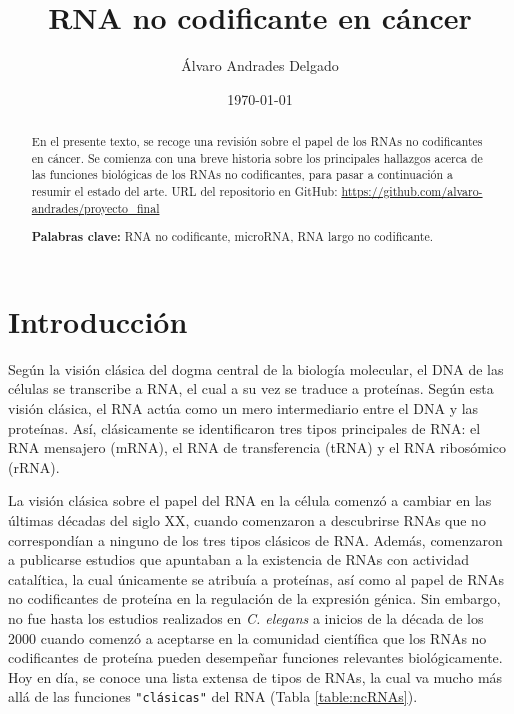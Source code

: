 \documentclass[a4paper,11pt]{article}
\begin{document}
\title{RNA no codificante en cáncer}
\author{Álvaro Andrades Delgado}
\date{\today}
\maketitle

\begin{abstract}

En el presente texto, se recoge una revisión sobre el papel de los RNAs no codificantes en cáncer. Se comienza con una breve historia sobre los principales hallazgos acerca de las funciones biológicas de los RNAs no codificantes, para pasar a continuación a resumir el estado del arte. URL del repositorio en GitHub: \url{https://github.com/alvaro-andrades/proyecto_final} 

\textbf{Palabras clave:} RNA no codificante, microRNA, RNA largo no codificante.

\end{abstract}



\section{Introducción}

Según la visión clásica del dogma central de la biología molecular, el DNA de las células se transcribe a RNA, el cual a su vez se traduce a proteínas\cite{Kung2013}. Según esta visión clásica, el RNA actúa como un mero intermediario entre el DNA y las proteínas. Así, clásicamente se identificaron tres tipos principales de RNA: el RNA mensajero (mRNA), el RNA de transferencia (tRNA) y el RNA ribosómico (rRNA)\cite{Cech2014}.

La visión clásica sobre el papel del RNA en la célula comenzó a cambiar en las últimas décadas del siglo XX, cuando comenzaron a descubrirse RNAs que no correspondían a ninguno de los tres tipos clásicos de RNA\cite{Cech2014}. Además, comenzaron a publicarse estudios que apuntaban a la existencia de RNAs con actividad catalítica, la cual únicamente se atribuía a proteínas\cite{Kruger1982}, así como al papel de RNAs no codificantes de proteína en la regulación de la expresión génica\cite{Brannan1990}. Sin embargo, no fue hasta los estudios realizados en \textit{C. elegans} a inicios de la década de los 2000 cuando comenzó a aceptarse en la comunidad científica que los RNAs no codificantes de proteína pueden desempeñar funciones relevantes biológicamente\cite{Grishok2001}. Hoy en día, se conoce una lista extensa de tipos de RNAs, la cual va mucho más allá de las funciones \verb="clásicas"= del RNA (Tabla \ref{table:ncRNAs}).
\end{document}
